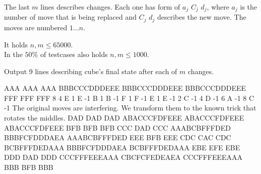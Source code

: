 The last $m$ lines describes changes.
Each one has form of $a_j$ $C_j$ $d_j$,
where $a_j$ is the number of move that
is being replaced and $C_j$ $d_j$ describes the 
new move.
The moves are numbered $1 \dots n$.

\smallskip

It holds $n,m \leq 65000$.\\
In the $50\%$ of testcases also holds
$n,m \leq 1000$.


Output 9 lines describing cube's final state after each of $m$ changes.



\sampleIN
AAA
AAA
AAA
BBBCCCDDDEEE
BBBCCCDDDEEE
BBBCCCDDDEEE
FFF
FFF
FFF
8 4
E 1
E -1
B 1
B -1
F 1
F -1
E 1
E -1
2 C -1
4 D -1
6 A -1
8 C -1
\sampleCOMMENT
The original moves are interfering.
We transform them to the known trick
that rotates the middles.
\sampleOUT
DAD
DAD
DAD
ABACCCFDFEEE
ABACCCFDFEEE
ABACCCFDFEEE
BFB
BFB
BFB
CCC
DAD
CCC
AAABCBFFFDED
BBBFCFDDDAEA
AAABCBFFFDED
EEE
BFB
EEE
CDC
CAC
CDC
BCBFFFDEDAAA
BBBFCFDDDAEA
BCBFFFDEDAAA
EBE
EFE
EBE
DDD
DAD
DDD
CCCFFFEEEAAA
CBCFCFEDEAEA
CCCFFFEEEAAA
BBB
BFB
BBB
\sampleEND


